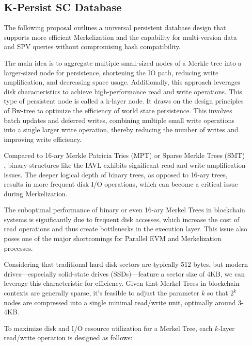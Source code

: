 \subsection{K-Persist SC Database}

The following proposal outlines a universal persistent database design that supports more efficient Merkelization and the capability for multi-version data and SPV queries without compromising hash compatibility. 

The main idea is to aggregate multiple small-sized nodes of a Merkle tree into a larger-sized node for persistence, shortening the IO path, reducing write amplification, and decreasing space usage. Additionally, this approach leverages disk characteristics to achieve high-performance read and write operations. This type of persistent node is called a k-layer node. It draws on the design principles of Bw-tree to optimize the efficiency of world state persistence. This involves batch updates and deferred writes, combining multiple small write operations into a single larger write operation, thereby reducing the number of writes and improving write efficiency. 

Compared to 16-ary Merkle Patricia Tries (MPT) \cite{ethereum_patricia_merkle_trie} or Sparse Merkle Trees (SMT) \cite{fichter_sparse_merkle_tree}, binary structures like the IAVL exhibits significant read and write amplification issues. The deeper logical depth of binary trees, as opposed to 16-ary trees, results in more frequent disk I/O operations, which can become a critical issue during Merkelization.

The suboptimal performance of binary or even 16-ary Merkel Trees in blockchain systems is significantly due to frequent disk accesses, which increase the cost of read operations and thus create bottlenecks in the execution layer. This issue also poses one of the major shortcomings for Parallel EVM and Merkelization processes.

Considering that traditional hard disk sectors are typically 512 bytes, but modern drives—especially solid-state drives (SSDs)—feature a sector size of 4KB, we can leverage this characteristic for efficiency. Given that Merkel Trees in blockchain contexts are generally sparse, it's feasible to adjust the parameter $k$ so that $2^k$ nodes are compressed into a single minimal read/write unit, optimally around 3-4KB.

To maximize disk and I/O resource utilization for a Merkel Tree, each $k$-layer read/write operation is designed as follows:

